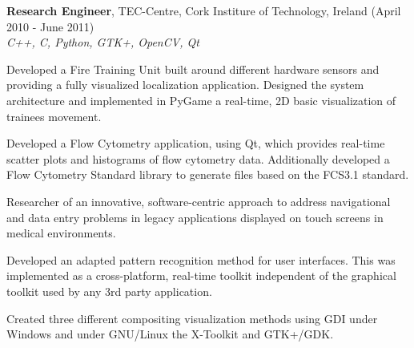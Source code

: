 \documentclass[alan.tex]{subfiles}
\begin{document}
  \item \textbf{Research Engineer}, TEC-Centre, Cork Institure of Technology, Ireland (April 2010 - June 2011)\\
    \emph{C++, C, Python, GTK+, OpenCV, Qt}
    \begin{my_desc}
      \item[Developed] a Fire Training Unit built around different hardware sensors and providing a fully visualized localization application. Designed the system architecture and implemented in PyGame a real-time, 2D basic visualization of trainees movement.
      \item[Developed] a Flow Cytometry application, using Qt, which provides real-time scatter plots and histograms of flow cytometry data. Additionally developed a Flow Cytometry Standard library to generate files based on the FCS3.1 standard.
      \item[Researcher] of an innovative, software-centric approach to address navigational and data entry problems in legacy applications displayed on touch screens in medical environments. 
      \begin{my_bullets}
        \item Developed an adapted pattern recognition method for user interfaces. This was implemented as a cross-platform, real-time toolkit independent of the graphical toolkit used by any 3rd party application. 
        \item Created three different compositing visualization methods using GDI under Windows and under GNU/Linux the X-Toolkit and GTK+/GDK.
      \end{my_bullets}
  \end{my_desc}
\end{document}
